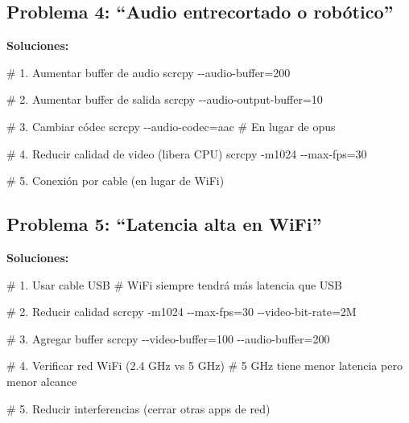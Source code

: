 \documentclass[
  doc,
  floatsintext,
  longtable,
  a4paper,
  nolmodern,
  notxfonts,
  notimes,
  12pt,
  colorlinks=true,linkcolor=blue,citecolor=blue,urlcolor=blue]{apa7}
\newenvironment{Shaded}{\begin{snugshade}}{\end{snugshade}}
\newcommand{\AttributeTok}[1]{\textcolor[rgb]{0.40,0.45,0.13}{#1}}
\newcommand{\CommentTok}[1]{\textcolor[rgb]{0.37,0.37,0.37}{#1}}
\newcommand{\ExtensionTok}[1]{\textcolor[rgb]{0.00,0.23,0.31}{#1}}
\newcommand{\NormalTok}[1]{\textcolor[rgb]{0.00,0.23,0.31}{#1}}
\newcommand{\OperatorTok}[1]{\textcolor[rgb]{0.37,0.37,0.37}{#1}}
\begin{document}
\subsection{Problema 4: ``Audio entrecortado o
robótico''}\label{problema-4-audio-entrecortado-o-robuxf3tico}

\textbf{Soluciones:}

\begin{Shaded}
\begin{Highlighting}[]
\CommentTok{\# 1. Aumentar buffer de audio}
\ExtensionTok{scrcpy} \AttributeTok{{-}{-}audio{-}buffer}\OperatorTok{=}\NormalTok{200}

\CommentTok{\# 2. Aumentar buffer de salida}
\ExtensionTok{scrcpy} \AttributeTok{{-}{-}audio{-}output{-}buffer}\OperatorTok{=}\NormalTok{10}

\CommentTok{\# 3. Cambiar códec}
\ExtensionTok{scrcpy} \AttributeTok{{-}{-}audio{-}codec}\OperatorTok{=}\NormalTok{aac  }\CommentTok{\# En lugar de opus}

\CommentTok{\# 4. Reducir calidad de video (libera CPU)}
\ExtensionTok{scrcpy} \AttributeTok{{-}m1024} \AttributeTok{{-}{-}max{-}fps}\OperatorTok{=}\NormalTok{30}

\CommentTok{\# 5. Conexión por cable (en lugar de WiFi)}
\end{Highlighting}
\end{Shaded}

\subsection{Problema 5: ``Latencia alta en
WiFi''}\label{problema-5-latencia-alta-en-wifi}

\textbf{Soluciones:}

\begin{Shaded}
\begin{Highlighting}[]
\CommentTok{\# 1. Usar cable USB}
\CommentTok{\# WiFi siempre tendrá más latencia que USB}

\CommentTok{\# 2. Reducir calidad}
\ExtensionTok{scrcpy} \AttributeTok{{-}m1024} \AttributeTok{{-}{-}max{-}fps}\OperatorTok{=}\NormalTok{30 }\AttributeTok{{-}{-}video{-}bit{-}rate}\OperatorTok{=}\NormalTok{2M}

\CommentTok{\# 3. Agregar buffer}
\ExtensionTok{scrcpy} \AttributeTok{{-}{-}video{-}buffer}\OperatorTok{=}\NormalTok{100 }\AttributeTok{{-}{-}audio{-}buffer}\OperatorTok{=}\NormalTok{200}

\CommentTok{\# 4. Verificar red WiFi (2.4 GHz vs 5 GHz)}
\CommentTok{\# 5 GHz tiene menor latencia pero menor alcance}

\CommentTok{\# 5. Reducir interferencias (cerrar otras apps de red)}
\end{Highlighting}
\end{Shaded}
\end{document}
